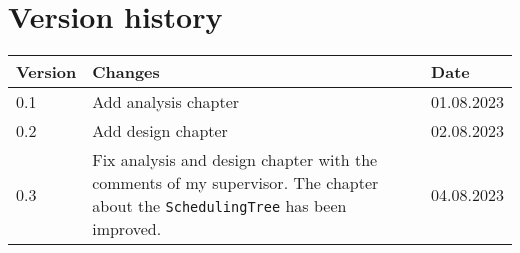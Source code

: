 \chapter{Version history}
\label{chap:report-versions}

\begin{tabular}{|m{}|m{}|m{}|}
 \hline
 \textbf{Version} & \textbf{Changes} & \textbf{Date} \\ [0.5ex]
 \hline
    0.1 & Add analysis chapter & 01.08.2023  \\
 \hline
    0.2 & Add design chapter & 02.08.2023  \\
 \hline
    0.3 & Fix analysis and design chapter with the comments of my supervisor.
    The chapter about the \texttt{SchedulingTree} has been improved.
    & 04.08.2023  \\
 \hline
\end{tabular}